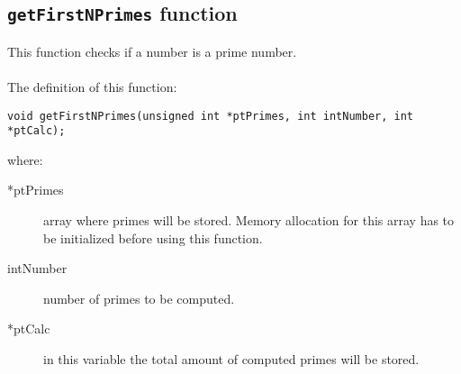 \subsection{\texttt{getFirstNPrimes} function}

This function checks if a number is a prime number.\\ \\
%
The definition of this function:
%
\begin{verbatim}
void getFirstNPrimes(unsigned int *ptPrimes, int intNumber, int *ptCalc);
\end{verbatim}
%
where:
%
\begin{description}
\item[*ptPrimes] array where primes will be stored. Memory allocation for this array has to be initialized before using this function.
\item[intNumber] number of primes to be computed.
\item[*ptCalc] in this variable the total amount of computed primes will be stored.
\end{description}
